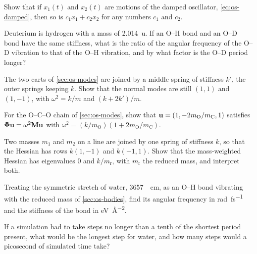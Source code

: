 \begin{exercise}
\label{ex:os-linear}
Show that if $x_1(t)$ and $x_2(t)$ are motions of the damped oscillator,
\cref{eq:os-damped}, then so is $c_1x_1 + c_2x_2$ for any numbers $c_1$
and $c_2$.
\end{exercise}

\begin{exercise}
\label{ex:os-isotope}
Deuterium is hydrogen with a mass of \SI{2.014}{\amu}. If an O--H bond and
an O--D bond have the same stiffness, what is the ratio of the angular
frequency of the O--D vibration to that of the O--H vibration, and by what
factor is the O--D period longer?
\end{exercise}

\begin{exercise}
\label{ex:os-coupling}
The two carts of \cref{sec:os-modes} are joined by a middle spring of
stiffness $k'$, the outer springs keeping $k$. Show that the normal modes
are still $(1, 1)$ and $(1, -1)$, with $\omega^2 = k/m$ and $(k +
2k')/m$.
\end{exercise}

\begin{exercise}
\label{ex:os-triatomic}
For the O--C--O chain of \cref{sec:os-modes}, show that $\bm{\mathrm{u}} = (1,
-2m_{\mathrm O}/m_{\mathrm C}, 1)$ satisfies $\boldsymbol{\Phi}\bm{\mathrm{u}} =
\omega^2\bm{\mathrm{M}}\bm{\mathrm{u}}$ with $\omega^2 = (k/m_{\mathrm O})(1 + 2m_{\mathrm
O}/m_{\mathrm C})$.
\end{exercise}

\begin{exercise}
\label{ex:os-pair}
Two masses $m_1$ and $m_2$ on a line are joined by one spring of stiffness
$k$, so that the Hessian has rows $k(1, -1)$ and $k(-1, 1)$. Show that
the mass-weighted Hessian has eigenvalues $0$ and $k/m_{\mathrm r}$, with $m_{\mathrm r}$
the reduced mass, and interpret both.
\end{exercise}

\begin{exercise}
\label{ex:os-stiffness}
Treating the symmetric stretch of water, \SI{3657}{\per\centi\metre}, as an
O--H bond vibrating with the reduced mass of \cref{sec:os-bodies}, find
its angular frequency in \si{\radian\per\femto\second} and the stiffness of
the bond in \si{\electronvolt\per\angstrom\squared}.
\end{exercise}

\begin{exercise}
\label{ex:os-step}
If a simulation had to take steps no longer than a tenth of the shortest
period present, what would be the longest step for water, and how many
steps would a picosecond of simulated time take?
\end{exercise}
